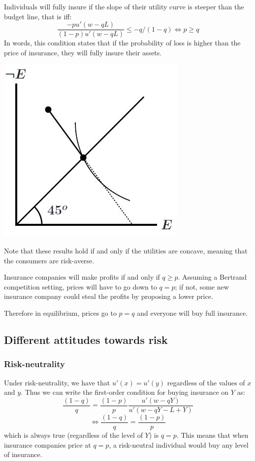 \documentclass[12pt]{report}
\begin{document}
\begin{minipage}{0.69\textwidth}
Individuals will fully insure if the slope of their utility curve is steeper than the budget line, that is iff: $$ \frac{-pu'(w - qL)}{(1-p)u'(w - qL)} \leq -q/(1-q) \Leftrightarrow p\geq q$$ In words, this condition states that if the probability of loss is higher than the price of insurance, they will fully insure their assets.
\end{minipage}
\begin{minipage}{0.29\textwidth}
\centering
\includegraphics[scale=0.35]{images/fullins}
\end{minipage} \hfill

Note that these results hold if and only if the utilities are concave, meaning that the consumers are risk-averse.

Insurance companies will make profits if and only if $q \geq p$. Assuming a Bertrand competition setting, prices will have to go down to $q = p$; if not, some new insurance company could steal the profits by proposing a lower price.

Therefore in equilibrium, prices go to $p=q$ and everyone will buy full insurance.

\subsection{Different attitudes towards risk}

\subsubsection{Risk-neutrality}

Under risk-neutrality, we have that $u'(x) = u'(y)$ regardless of the values of $x$ and $y$. Thus we can write the first-order condition for buying insurance on $Y$ as: $$ \frac{(1-q)}{q} = \frac{(1 - p)}{p}\frac{u'(w - qY)}{u'(w - qY - L + Y)} $$ $$\Leftrightarrow \frac{(1-q)}{q} = \frac{(1 - p)}{p} $$ which is always true (regardless of the level of $Y$) is $q = p$. This means that when insurance companies price at $q = p$, a risk-neutral individual would buy any level of insurance.
\end{document}
